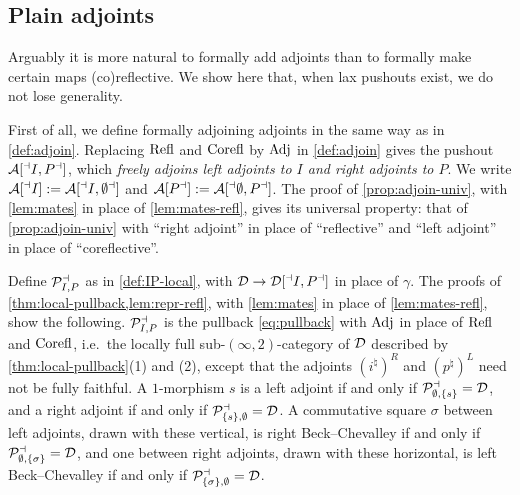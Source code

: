 \subsection{Plain adjoints}
\label{subsec:2dloc-plain}

%
Arguably it is more natural to formally add adjoints than to formally make
certain maps (co)reflective.
We show here that, when lax pushouts exist, we do not lose generality.

%
First of all, we define formally adjoining adjoints in the same way as in
\cref{def:adjoin}.
Replacing $\mathrm{Refl}$ and $\mathrm{Corefl}$ by $\mathrm{Adj}$ in \cref{def:adjoin} gives the pushout
$\mathcal{A}[{}^{\dashv}{I},{P}^{\dashv}]$, which \emph{freely adjoins left adjoints to $I$ and right
adjoints to $P$}. We write
$\mathcal{A}[{}^{\dashv}{I}] := \mathcal{A}[{}^{\dashv}{I},{\emptyset}^{\dashv}]$
and
$\mathcal{A}[{P}^{\dashv}] := \mathcal{A}[{}^{\dashv}{\emptyset},{P}^{\dashv}]$.
The proof of \cref{prop:adjoin-univ}, with \cref{lem:mates} in place of
\cref{lem:mates-refl}, gives its universal property:
that of \cref{prop:adjoin-univ} with ``right adjoint'' in place of
``reflective'' and ``left adjoint'' in place of ``coreflective''.

%
Define $\mathcal{P}^{\dashv}_{I,P}$ as in \cref{def:IP-local}, with
$\mathcal{D} \to \mathcal{D}[{}^{\dashv}{I},{P}^{\dashv}]$
in place of $\gamma$. The proofs of \cref{thm:local-pullback,lem:repr-refl},
with \cref{lem:mates} in place of \cref{lem:mates-refl}, show the following.
$\mathcal{P}^{\dashv}_{I,P}$ is the pullback \eqref{eq:pullback} with $\mathrm{Adj}$ in place of
$\mathrm{Refl}$ and $\mathrm{Corefl}$, i.e.\ the locally full sub-$(\infty,2)$-category of $\mathcal{D}$
described by \cref{thm:local-pullback}(1) and (2),
except that the adjoints $(i^{\natural})^{R}$ and $(p^{\natural})^{L}$ need not
be fully faithful. A $1$-morphism $s$ is a left adjoint if and only if
$\mathcal{P}^{\dashv}_{\emptyset,\{s\}} = \mathcal{D}$,
and a right adjoint if and only if
$\mathcal{P}^{\dashv}_{\{s\},\emptyset} = \mathcal{D}$.
A commutative square $\sigma$ between left adjoints, drawn with these vertical,
is right Beck--Chevalley if and only if
$\mathcal{P}^{\dashv}_{\emptyset,\{\sigma\}} = \mathcal{D}$,
and one between right adjoints, drawn with these horizontal,
is left Beck--Chevalley if and only if
$\mathcal{P}^{\dashv}_{\{\sigma\},\emptyset} = \mathcal{D}$.

